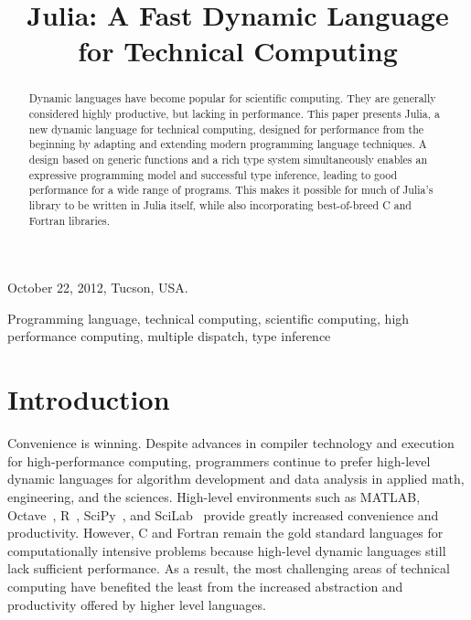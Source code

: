\documentclass[9pt]{sigplanconf}
\newcommand{\Matlab}{MATLAB\textsuperscript{\tiny\textregistered}}
\begin{document}
               {October 22, 2012, Tucson, USA.}


\title{Julia: A Fast Dynamic Language for Technical Computing}


\maketitle
\begin{abstract}
  Dynamic languages have become popular for scientific computing. They
  are generally considered highly productive, but lacking in performance.
  This paper presents Julia, a new dynamic language for technical
  computing, designed for performance from the beginning by adapting and
  extending modern programming language techniques. A design based on
  generic functions and a rich type system simultaneously enables an
  expressive programming model and successful type inference, leading to
  good performance for a wide range of programs. This makes it possible
  for much of Julia's library to be written in Julia itself, while also
  incorporating best-of-breed C and Fortran libraries.
\end{abstract}



\keywords
Programming language, technical computing, scientific computing, high
performance computing, multiple dispatch, type inference

\section{Introduction}

Convenience is winning. Despite advances in compiler technology and
execution for high-performance computing, programmers continue to prefer
high-level dynamic languages for algorithm development and data analysis
in applied math, engineering, and the sciences. High-level environments
such as \Matlab\!, Octave~\cite{Octave}, R~\cite{Rlang},
SciPy~\cite{numpy}, and SciLab~\cite{scilab} provide greatly increased
convenience and productivity. However, C and Fortran remain the gold
standard languages for computationally intensive problems because
high-level dynamic languages still lack sufficient performance. As a
result, the most challenging areas of technical computing have benefited
the least from the increased abstraction and productivity offered by
higher level languages.
\end{document}

